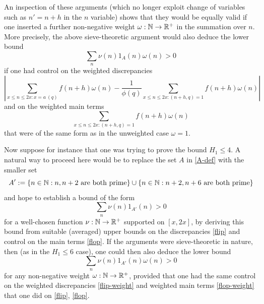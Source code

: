 An inspection of these arguments (which no longer exploit change of variables such as $n' = n+h$ in the $n$ variable) shows that they would be equally valid if one inserted a further non-negative weight $\omega: \mathbb{N} \to \mathbb{R}^+$ in the summation over $n$.  More precisely, the above sieve-theoretic argument would also deduce the lower bound
$$ \sum_n \nu(n) 1_A(n) \omega(n) > 0$$
if one had control on the weighted discrepancies
\begin{equation}\label{flip-weight}
 \left|\sum_{x \leq n \leq 2x: x = a\ (q)} f(n+h) \omega(n) - \frac{1}{\phi(q)} \sum_{x \leq n \leq 2x: (n+h,q)=1} f(n+h) \omega(n)\right|
\end{equation}
and on the weighted main terms
\begin{equation}\label{flop-weight}
\sum_{x \leq n \leq 2x: (n+h,q)=1} f(n+h) \omega(n)
\end{equation}
that were of the same form as in the unweighted case $\omega=1$.

Now suppose for instance that one was trying to prove the bound $H_1 \leq 4$.  A natural way to proceed here would be to replace the set $A$ in \eqref{A-def} with the smaller set
\begin{equation}\label{app}
 A' := \{ n \in \mathbb{N}: n, n+2 \hbox{ are both prime} \} \cup \{ n \in \mathbb{N}: n+2, n+6 \hbox{ are both prime} \}
\end{equation}
and hope to establish a bound of the form
$$ \sum_n \nu(n) 1_{A'}(n) > 0$$
for a well-chosen function $\nu: \mathbb{N} \to \mathbb{R}^+$ supported on $[x,2x]$, by deriving this bound from suitable (averaged) upper bounds on the discrepancies \eqref{flip} and control on the main terms \eqref{flop}.  If the arguments were sieve-theoretic in nature, then (as in the $H_1 \leq 6$ case), one could then also deduce the lower bound
\begin{equation}\label{ap-lower}
 \sum_n \nu(n) 1_{A'}(n) \omega(n) > 0
\end{equation}
for any non-negative weight $\omega: \mathbb{N} \to \mathbb{R}^+$, provided that one had the same control on the weighted discrepancies \eqref{flip-weight} and weighted main terms \eqref{flop-weight} that one did on \eqref{flip}, \eqref{flop}.

